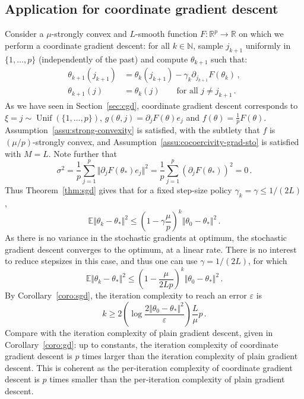 \documentclass[11pt,reqno]{article}
\DeclareMathOperator{\Unif}{Unif}
\newcommand{\N}{\mathbb{N}}
\newcommand{\E}{\mathbb{E}}
\newcommand{\R}{\mathbb{R}}
\renewcommand{\leq}{\leqslant}
\renewcommand{\geq}{\geqslant}
\numberwithin{equation}{section}
\theoremstyle{plain}
\theoremstyle{definition}
\theoremstyle{remark}
\begin{document}
\subsection{Application for coordinate gradient descent}
\label{sec:application-cgd}

Consider a $\mu$-strongly convex and $L$-smooth function $F:\R^p \to \R$ on which we perform a coordinate gradient descent: for all $k \in \N$, sample $j_{k+1}$ uniformly in $\{1, \dots, p\}$ (independently of the past) and compute $\theta_{k+1}$ such that:
\begin{align*}
	\theta_{k+1}(j_{k+1}) &= \theta_k(j_{k+1}) - \gamma_k \partial_{j_{k+1}} F(\theta_k)  \, , \\
	\theta_{k+1}(j) &= \theta_k(j) \qquad \text{for all } j \neq j_{k+1} \, .
\end{align*}
As we have seen in Section~\ref{sec:cgd}, coordinate gradient descent corresponds to $\xi = j \sim \Unif(\{1, \dots, p\})$, $g(\theta,j) = \partial_j F(\theta) e_j$ and $f(\theta) = \frac{1}{p} F(\theta)$. Assumption~\ref{assu:strong-convexity} is satisfied, with the subtlety that $f$ is $(\mu/p)$-strongly convex, and Assumption~\ref{assu:cocoercivity-grad-sto} is satisfied with $M = L$. Note further that 
\begin{equation*}
	\sigma^2 = \frac{1}{p} \sum_{j=1}^{p} \Vert \partial_j F(\theta_*) e_j \Vert^2 = \frac{1}{p} \sum_{j=1}^{p} (\partial_j F(\theta_*))^2 = 0 \, .
\end{equation*}
Thus Theorem~\ref{thm:sgd} gives that for a fixed step-size policy $\gamma_k = \gamma \leq 1/(2L)$,
\begin{equation*}
	\E \Vert \theta_k - \theta_* \Vert^2 \leq \left(1 - \gamma \frac{\mu}{p}\right)^k \Vert \theta_0 - \theta_* \Vert^2 \, .
\end{equation*}
As there is no variance in the stochastic gradients at optimum, the stochastic gradient descent converges to the optimum, at a linear rate. There is no interest to reduce stepsizes in this case, and thus one can use $\gamma = 1/(2L)$, for which 
\begin{equation*}
	\E \Vert \theta_k - \theta_* \Vert^2 \leq \left(1 - \frac{\mu}{2Lp}\right)^k \Vert \theta_0 - \theta_* \Vert^2 \, .
\end{equation*}
By Corollary~\ref{coro:sgd}, the iteration complexity to reach an error $\varepsilon$ is 
\begin{equation*}
	k \geq 2 \left(\log \frac{2 \Vert \theta_0 - \theta_* \Vert^2}{\varepsilon}\right) \frac{L}{\mu} p \, .
\end{equation*}
Compare with the iteration complexity of plain gradient descent, given in Corollary~\ref{coro:gd}: up to constants, the iteration complexity of coordinate gradient descent is $p$ times larger than the iteration complexity of plain gradient descent. This is coherent as the per-iteration complexity of coordinate gradient descent is $p$ times smaller than the per-iteration complexity of plain gradient descent.
\end{document}
